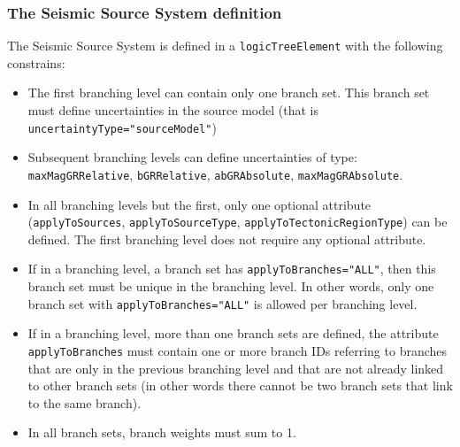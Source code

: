 \subsubsection{The Seismic Source System definition}
The Seismic Source System is defined in a \Verb+logicTreeElement+ with the following constrains:
\begin{itemize}
\item The first branching level can contain only one branch set. This branch set must define uncertainties in the source model (that is \Verb+uncertaintyType="sourceModel"+)
\item Subsequent branching levels can define uncertainties of type: \Verb+maxMagGRRelative+, \Verb+bGRRelative+, \Verb+abGRAbsolute+, \Verb+maxMagGRAbsolute+.
\item In all branching levels but the first, only one optional attribute (\Verb+applyToSources+, \Verb+applyToSourceType+, \Verb+applyToTectonicRegionType+) can be defined. The first branching level does not require any optional attribute.
\item If in a branching level, a branch set has \Verb+applyToBranches="ALL"+, then this branch set must be unique in the branching level. In other words, only one branch set with \Verb+applyToBranches="ALL"+ is allowed per branching level.
\item If in a branching level, more than one branch sets are defined, the attribute \Verb+applyToBranches+ must contain one or more branch IDs referring to branches that are only in the previous branching level and that are not already linked to other branch sets (in other words there cannot be two branch sets that link to the same branch).
\item In all branch sets, branch weights must sum to 1.
\end{itemize}
